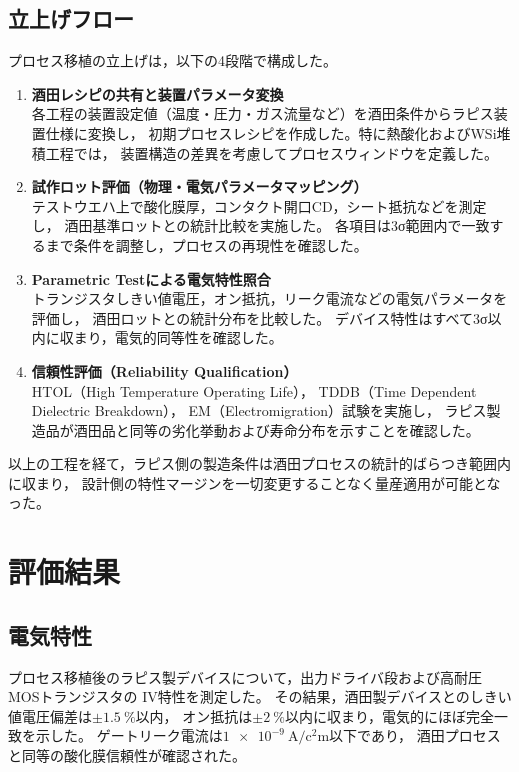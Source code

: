 \documentclass[conference]{IEEEtran}
\begin{document}
\subsection{立上げフロー}
プロセス移植の立上げは，以下の4段階で構成した。

\begin{enumerate}
  \item \textbf{酒田レシピの共有と装置パラメータ変換}\\
  各工程の装置設定値（温度・圧力・ガス流量など）を酒田条件からラピス装置仕様に変換し，
  初期プロセスレシピを作成した。特に熱酸化およびWSi堆積工程では，
  装置構造の差異を考慮してプロセスウィンドウを定義した。

  \item \textbf{試作ロット評価（物理・電気パラメータマッピング）}\\
  テストウエハ上で酸化膜厚，コンタクト開口CD，シート抵抗などを測定し，
  酒田基準ロットとの統計比較を実施した。
  各項目は3σ範囲内で一致するまで条件を調整し，プロセスの再現性を確認した。

  \item \textbf{Parametric Testによる電気特性照合}\\
  トランジスタしきい値電圧，オン抵抗，リーク電流などの電気パラメータを評価し，
  酒田ロットとの統計分布を比較した。
  デバイス特性はすべて3σ以内に収まり，電気的同等性を確認した。

  \item \textbf{信頼性評価（Reliability Qualification）}\\
  HTOL（High Temperature Operating Life），
  TDDB（Time Dependent Dielectric Breakdown），
  EM（Electromigration）試験を実施し，
  ラピス製造品が酒田品と同等の劣化挙動および寿命分布を示すことを確認した。
\end{enumerate}

以上の工程を経て，ラピス側の製造条件は酒田プロセスの統計的ばらつき範囲内に収まり，
設計側の特性マージンを一切変更することなく量産適用が可能となった。

\section{評価結果}

\subsection{電気特性}
プロセス移植後のラピス製デバイスについて，出力ドライバ段および高耐圧MOSトランジスタの
IV特性を測定した。
その結果，酒田製デバイスとのしきい値電圧偏差は$\pm\SI{1.5}{\percent}$以内，
オン抵抗は$\pm\SI{2}{\percent}$以内に収まり，電気的にほぼ完全一致を示した。
ゲートリーク電流は$\SI{1e-9}{\ampere\per\square\centi\meter}$以下であり，
酒田プロセスと同等の酸化膜信頼性が確認された。
\end{document}
